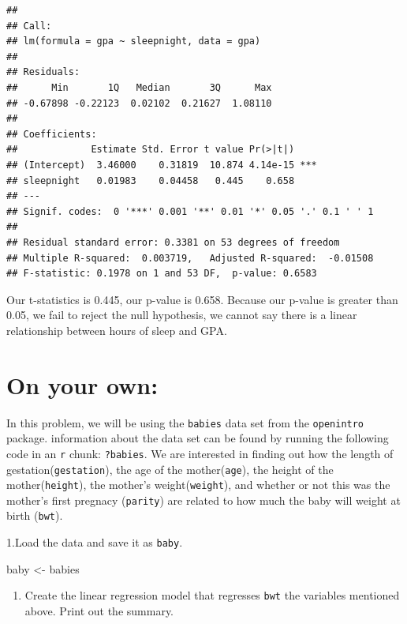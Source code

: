 \documentclass[]{article}
\newenvironment{Shaded}{\begin{snugshade}}{\end{snugshade}}
\newcommand{\NormalTok}[1]{#1}
\newcommand{\StringTok}[1]{\textcolor[rgb]{0.31,0.60,0.02}{#1}}
\providecommand{\tightlist}{%
  \setlength{\itemsep}{0pt}\setlength{\parskip}{0pt}}
\begin{document}
\begin{verbatim}
## 
## Call:
## lm(formula = gpa ~ sleepnight, data = gpa)
## 
## Residuals:
##      Min       1Q   Median       3Q      Max 
## -0.67898 -0.22123  0.02102  0.21627  1.08110 
## 
## Coefficients:
##             Estimate Std. Error t value Pr(>|t|)    
## (Intercept)  3.46000    0.31819  10.874 4.14e-15 ***
## sleepnight   0.01983    0.04458   0.445    0.658    
## ---
## Signif. codes:  0 '***' 0.001 '**' 0.01 '*' 0.05 '.' 0.1 ' ' 1
## 
## Residual standard error: 0.3381 on 53 degrees of freedom
## Multiple R-squared:  0.003719,   Adjusted R-squared:  -0.01508 
## F-statistic: 0.1978 on 1 and 53 DF,  p-value: 0.6583
\end{verbatim}

Our t-statistics is 0.445, our p-value is 0.658. Because our p-value is
greater than 0.05, we fail to reject the null hypothesis, we cannot say
there is a linear relationship between hours of sleep and GPA.

\newpage

\hypertarget{on-your-own}{%
\section{On your own:}\label{on-your-own}}

In this problem, we will be using the \texttt{babies} data set from the
\texttt{openintro} package. information about the data set can be found
by running the following code in an \texttt{r} chunk: \texttt{?babies}.
We are interested in finding out how the length of
gestation(\texttt{gestation}), the age of the mother(\texttt{age}), the
height of the mother(\texttt{height}), the mother's
weight(\texttt{weight}), and whether or not this was the mother's first
pregnacy (\texttt{parity}) are related to how much the baby will weight
at birth (\texttt{bwt}).

1.Load the data and save it as \texttt{baby}.

\begin{Shaded}
\begin{Highlighting}[]
\NormalTok{baby <-}\StringTok{ }\NormalTok{babies}
\end{Highlighting}
\end{Shaded}

\begin{enumerate}
\def\labelenumi{\arabic{enumi}.}
\setcounter{enumi}{1}
\tightlist
\item
  Create the linear regression model that regresses \texttt{bwt} the
  variables mentioned above. Print out the summary.
\end{enumerate}
\end{document}
